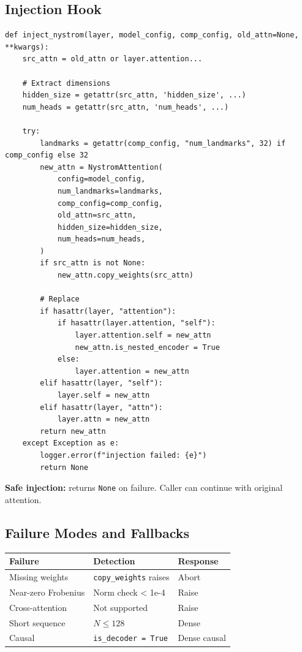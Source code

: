 \subsection{Injection Hook}

\begin{lstlisting}
def inject_nystrom(layer, model_config, comp_config, old_attn=None, **kwargs):
    src_attn = old_attn or layer.attention...
    
    # Extract dimensions
    hidden_size = getattr(src_attn, 'hidden_size', ...)
    num_heads = getattr(src_attn, 'num_heads', ...)
    
    try:
        landmarks = getattr(comp_config, "num_landmarks", 32) if comp_config else 32
        new_attn = NystromAttention(
            config=model_config,
            num_landmarks=landmarks,
            comp_config=comp_config,
            old_attn=src_attn,
            hidden_size=hidden_size,
            num_heads=num_heads,
        )
        if src_attn is not None:
            new_attn.copy_weights(src_attn)
        
        # Replace
        if hasattr(layer, "attention"):
            if hasattr(layer.attention, "self"):
                layer.attention.self = new_attn
                new_attn.is_nested_encoder = True
            else:
                layer.attention = new_attn
        elif hasattr(layer, "self"):
            layer.self = new_attn
        elif hasattr(layer, "attn"):
            layer.attn = new_attn
        return new_attn
    except Exception as e:
        logger.error(f"injection failed: {e}")
        return None
\end{lstlisting}

\textbf{Safe injection:} returns \texttt{None} on failure. Caller can continue with 
original attention.

\subsection{Failure Modes and Fallbacks}

\begin{table}[H]
\centering
\small
\begin{tabular}{lll}
\toprule
\textbf{Failure} & \textbf{Detection} & \textbf{Response} \\
\midrule
Missing weights & \texttt{copy\_weights} raises & Abort \\
Near-zero Frobenius & Norm check < 1e-4 & Raise \\
Cross-attention & Not supported & Raise \\
Short sequence & $N \leq 128$ & Dense \\
Causal & \texttt{is\_decoder = True} & Dense causal \\
\bottomrule
\end{tabular}
\end{table}

